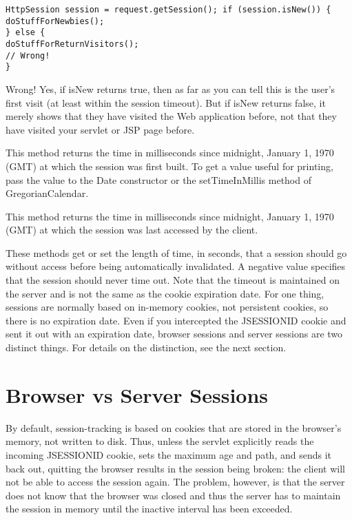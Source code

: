 \documentclass[a4paper,10pt]{scrreprt}
\begin{document}
{\begin{description}
\begin{lstlisting}[caption=Wring isNew for session]
 HttpSession session = request.getSession(); if (session.isNew()) {
doStuffForNewbies();
} else {
doStuffForReturnVisitors();
// Wrong!
}
\end{lstlisting}
Wrong! Yes, if isNew returns true, then as far as you can tell this is the user’s first visit (at least within the
session timeout). But if isNew returns false, it merely shows that they have visited the Web application
before, not that they have visited your servlet or JSP page before.

\item[public long getCreationTime()] This method returns the time in milliseconds since midnight, January 1, 1970 (GMT) 
at which the session was first built. To get a value useful for printing, pass the value to the Date constructor or the 
setTimeInMillis method of GregorianCalendar.
\item[public long getLastAccessedTime()]This method returns the time in milliseconds since midnight, January 1, 1970 
(GMT) at which the session was last accessed by the client. 
\item[public int getMaxInactiveInterval()] 
\item[public void setMaxInactiveInterval(int seconds)] These methods get or set the length of time, in seconds, that a 
session should go without access before being automatically invalidated. A negative value specifies that the session 
should never time out. Note that the timeout is maintained on the server and is not the same as the cookie expiration 
date. For one thing, sessions are normally based on in-memory cookies, not persistent cookies, so there is no expiration 
date. Even if you intercepted the JSESSIONID cookie and sent it out with an expiration date, browser sessions and server 
sessions are two distinct things. For details on the distinction, see the next section.
\end{description}

\section{Browser vs Server Sessions}
By default, session-tracking is based on cookies that are stored in the browser’s memory, not written to disk. Thus,
unless the servlet explicitly reads the incoming JSESSIONID cookie, sets the maximum age and path, and sends it
back out, quitting the browser results in the session being broken: the client will not be able to access the session
again. The problem, however, is that the server does not know that the browser was closed and thus the server has to
maintain the session in memory until the inactive interval has been exceeded.

}
\end{document}
